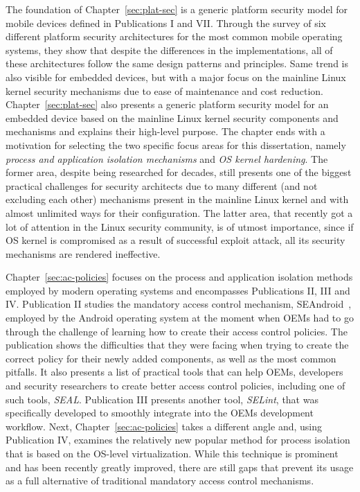 The foundation of Chapter~\ref{sec:plat-sec} is a generic platform security model for mobile devices defined in Publications I and VII. Through the survey of six different platform security architectures for the most common mobile operating systems, they show that despite the differences in the implementations, all of these architectures follow the same design patterns and principles. Same trend is also visible for embedded devices, but with a major focus on the mainline Linux kernel security mechanisms due to ease of maintenance and cost reduction. Chapter~\ref{sec:plat-sec} also presents a generic platform security model for an embedded device based on the mainline Linux kernel security components and mechanisms and explains their high-level purpose. The chapter ends with a motivation for selecting the two specific focus areas for this dissertation, namely \textit{process and application isolation mechanisms} and \textit{OS kernel hardening}. The former area, despite being researched for decades, still presents one of the biggest practical challenges for security architects due to many different (and not excluding each other) mechanisms present in the mainline Linux kernel and with almost unlimited ways for their configuration. The latter area, that recently got a lot of attention in the Linux security community, is of utmost importance, since if OS kernel is compromised as a result of successful exploit attack, all its security mechanisms are rendered ineffective.

Chapter~\ref{sec:ac-policies} focuses on the process and application isolation methods employed by modern operating systems and encompasses Publications II, III and IV. Publication II studies the mandatory access control mechanism, SEAndroid~\cite{smalley12}, employed by the Android operating system at the moment when OEMs had to go through the challenge of learning how to create their access control policies. The publication shows the difficulties that they were facing when trying to create the correct policy for their newly added components, as well as the most common pitfalls. It also presents a list of practical tools that can help OEMs, developers and security researchers to create better access control policies, including one of such tools, \textit{SEAL}. Publication III presents another tool, \textit{SELint}, that was specifically developed to smoothly integrate into the OEMs development workflow. Next, Chapter~\ref{sec:ac-policies} takes a different angle and, using Publication IV, examines the relatively new popular method for process isolation that is based on the OS-level virtualization. While this technique is prominent and has been recently greatly improved, there are still gaps that prevent its usage as a full alternative of traditional mandatory access control mechanisms.

